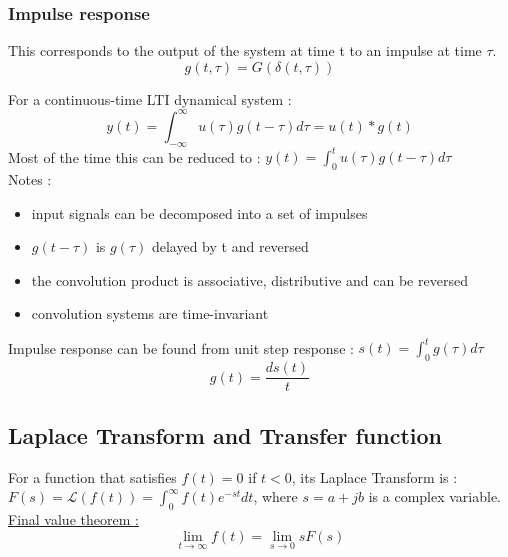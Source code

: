 \documentclass[../main.tex]{subfiles}
\begin{document}
\subsubsection{Impulse response}
This corresponds to the output of the system at time t to an impulse at time $\tau$.\\
\begin{equation}
    g(t,\tau) = G(\delta(t,\tau))
\end{equation}

For a continuous-time LTI dynamical system : \\
\begin{equation}
    y(t) = \int_{-\infty}^\infty u(\tau) g(t-\tau)d\tau = u(t)*g(t)
\end{equation}
Most of the time this can be reduced to : $y(t) = \int_0^t u(\tau) g(t-\tau) d\tau$\\

\color{gray}Notes : \begin{itemize}
    \item input signals can be decomposed into a set of impulses\\
    \item $g(t-\tau)$ is $g(\tau)$ delayed by t and reversed\\
    \item the convolution product is associative, distributive and can be reversed\\
    \item convolution systems are time-invariant\\
\end{itemize}\color{black}

Impulse response can be found from unit step response : $s(t) = \int_0^t g(\tau)d\tau$\\

\begin{equation}
    g(t) = \frac{d s(t)}{t}
\end{equation}

\subsection{Laplace Transform and Transfer function}
For a function that satisfies $f(t)=0$ if $t<0$, its Laplace Transform is : $F(s) = \mathcal{L}(f(t)) = \int_0^\infty f(t) e^{-st} dt$, where $s = a +jb$ is a complex variable.\\

\quad \underline{Final value theorem :}\\
\begin{equation}
    \lim_{t\rightarrow \infty} f(t) = \lim_{s\rightarrow 0} sF(s)
\end{equation}
\end{document}
